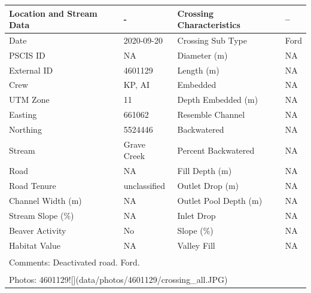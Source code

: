 \documentclass[
]{book}
\begin{document}
\begin{tabular}{l|l|l|l}
\hline
Location and Stream Data & - & Crossing Characteristics & --\\
\hline
Date & 2020-09-20 & Crossing Sub Type & Ford\\
\hline
PSCIS ID & NA & Diameter (m) & NA\\
\hline
External ID & 4601129 & Length (m) & NA\\
\hline
Crew & KP, AI & Embedded & NA\\
\hline
UTM Zone & 11 & Depth Embedded (m) & NA\\
\hline
Easting & 661062 & Resemble Channel & NA\\
\hline
Northing & 5524446 & Backwatered & NA\\
\hline
Stream & Grave Creek & Percent Backwatered & NA\\
\hline
Road & NA & Fill Depth (m) & NA\\
\hline
Road Tenure & unclassified & Outlet Drop (m) & NA\\
\hline
Channel Width (m) & NA & Outlet Pool Depth (m) & NA\\
\hline
Stream Slope (\%) & NA & Inlet Drop & NA\\
\hline
Beaver Activity & No & Slope (\%) & NA\\
\hline
Habitat Value & NA & Valley Fill & NA\\
\hline
\multicolumn{4}{l}{\textsuperscript{} Comments: Deactivated road. Ford.}\\
\multicolumn{4}{l}{\textsuperscript{} Photos: 4601129![](data/photos/4601129/crossing\_all.JPG)}\\
\end{tabular}
\end{document}

